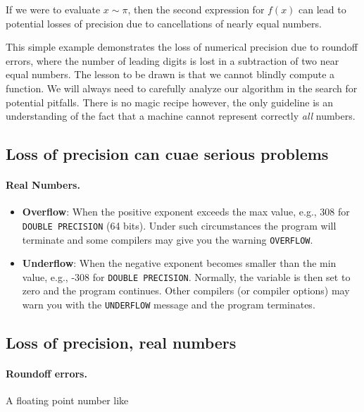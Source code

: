 \documentclass[%
oneside,                 %
final,                   %
10pt]{article}
\begin{document}
{{{{{If we were to evaluate $x\sim \pi$, then the second expression for $f(x)$
can lead to potential losses of precision due to cancellations of nearly
equal numbers.

This simple example demonstrates  the loss of numerical precision due
to roundoff errors, where the number of leading digits is lost
in a subtraction of two near equal numbers.
The lesson to be drawn is that we cannot blindly compute a function.
We will always need to carefully analyze our algorithm in the search for
potential pitfalls. There is no magic recipe however, the only guideline
is an understanding of the fact that a machine cannot represent
correctly \emph{all} numbers.

\subsection{Loss of precision can cuae serious problems}


\paragraph{Real Numbers.}

\begin{itemize}
  \item \textbf{Overflow}: When the positive exponent exceeds the max value, e.g., 308 for \Verb!DOUBLE PRECISION! (64 bits). Under such circumstances the program will terminate and some compilers may give you the warning \Verb!OVERFLOW!.

  \item \textbf{Underflow}: When the negative exponent becomes smaller than the min value, e.g., -308 for \Verb!DOUBLE PRECISION!. Normally, the variable is then set to zero and the program continues. Other compilers (or compiler options) may warn you with the \Verb!UNDERFLOW! message and the program terminates.
\end{itemize}

\noindent



\subsection{Loss of precision, real numbers}



\paragraph{Roundoff errors.}
A floating point number like

}}}}}
\end{document}
